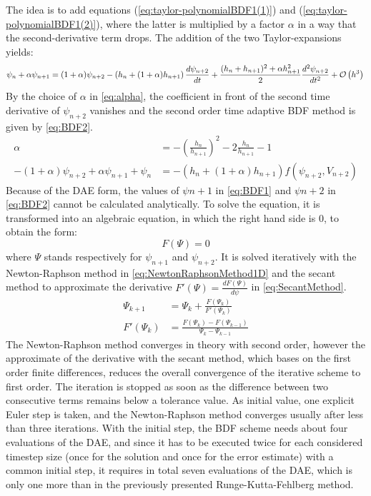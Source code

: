 \documentclass{report}
\begin{document}
The idea is to add equations (\ref{eq:taylor-polynomialBDF1(1)}) and (\ref{eq:taylor-polynomialBDF1(2)}), where the latter is multiplied by a factor $\alpha$ in a way that the second-derivative term drops. The addition of the two Taylor-expansions yields: 
\begin{equation}
	\psi_{n} + \alpha \psi_{n+1} = (1+\alpha)\psi_{n+2} - \left(h_{n} + (1+\alpha)h_{n+1}\right)\frac{d\psi_{n+2}}{dt} + \frac{(h_{n} + h_{n+1})^2+\alpha h_{n+1}^2}{2}\frac{d^2\psi_{n+2}}{dt^2} + \mathcal{O}\left(h^3\right) \\
\end{equation}
By the choice of $\alpha$ in \autoref{eq:alpha}, the coefficient in front of the second time derivative of $\psi_{n+2}$ vanishes and the second order time adaptive BDF method is given by \autoref{eq:BDF2}. 
\begin{align}
    \label{eq:alpha}
    \alpha &= -\left(\frac{h_n}{h_{n+1}}\right)^2 - 2\frac{h_n}{h_{n+1}} - 1 \\
    \label{eq:BDF2}
    -(1+\alpha)\psi_{n+2} + \alpha \psi_{n+1} + \psi_n &= -\left(h_n + (1+\alpha)h_{n+1}\right)f(\psi_{n+2}, V_{n+2})
\end{align}
Because of the DAE form, the values of $\psi{n+1}$ in \autoref{eq:BDF1} and $\psi{n+2}$ in \autoref{eq:BDF2} cannot be calculated analytically. To solve the equation, it is transformed into an algebraic equation, in which the right hand side is 0, to obtain the form:
\begin{equation}
    F(\Psi) = 0
\end{equation}
where $\Psi$ stands respectively for $\psi_{n+1}$ and $\psi_{n+2}$. It is solved iteratively with the Newton-Raphson method \cite{NewtonRaphsonMethod} in \autoref{eq:NewtonRaphsonMethod1D} and the secant method to approximate the derivative $F'(\Psi) = \frac{d F(\Psi)}{d\psi}$ in \autoref{eq:SecantMethod}. 
\begin{align}
    \label{eq:NewtonRaphsonMethod1D}
    \Psi_{k+1} &= \Psi_{k} + \frac{F\left(\Psi_k\right)}{F'\left(\Psi_k\right)} \\
    \label{eq:SecantMethod}
    F'\left(\Psi_k\right) &= \frac{F\left(\Psi_{k}\right) - F\left(\Psi_{k-1}\right)}{\Psi_{k} - \Psi_{k-1}}
\end{align}
The Newton-Raphson method converges in theory with second order, however the approximate of the derivative with the secant method, which bases on the first order finite differences, reduces the overall convergence of the iterative scheme to first order. The iteration is stopped as soon as the difference between two consecutive terms remains below a tolerance value. As initial value, one explicit Euler step is taken, and the Newton-Raphson method converges usually after less than three iterations. With the initial step, the BDF scheme needs about four evaluations of the DAE, and since it has to be executed twice for each considered timestep size (once for the solution and once for the error estimate) with a common initial step, it requires in total seven evaluations of the DAE, which is only one more than in the previously presented Runge-Kutta-Fehlberg method. \\
\end{document}
